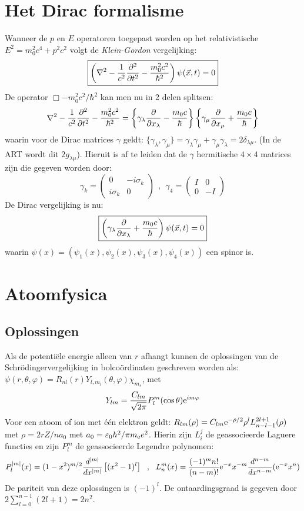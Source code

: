 \documentclass[twoside]{report}
\begin{document}
\section[~~Het Dirac formalisme]{Het Dirac formalisme}
Wanneer de $p$ en $E$ operatoren toegepast worden op het relativistische
$E^2=m_0^2c^4+p^2c^2$ volgt de {\it Klein-Gordon} vergelijking:
\[
\mbox{\fbox{$\displaystyle
\left(\nabla^2-\frac{1}{c^2}\frac{\partial^2 }{\partial t^2}-\frac{m_0^2c^2}{\hbar^2}\right)\psi(\vec{x},t)=0
$}}
\]
De operator $\Box-m_0^2c^2/\hbar^2$ kan men nu in 2 delen splitsen:
\[
\nabla^2-\frac{1}{c^2}\frac{\partial^2 }{\partial t^2}-\frac{m_0^2c^2}{\hbar^2}=
\left\{\gamma_\lambda\frac{\partial }{\partial x_\lambda}-\frac{m_0c}{\hbar}\right\}
\left\{\gamma_\mu\frac{\partial }{\partial x_\mu}+\frac{m_0c}{\hbar}\right\}
\]
waarin voor de Dirac matrices $\gamma$ geldt:
$\{\gamma_\lambda,\gamma_\mu\}=
\gamma_\lambda\gamma_\mu+\gamma_\mu\gamma_\lambda=2\delta_{\lambda\mu}$.
(In de ART wordt dit $2g_{\lambda\mu}$).
Hieruit is af te leiden dat de $\gamma$ hermitische $4\times4$ matrices zijn
die gegeven worden door:
\[
\gamma_k=\left(\begin{array}{cc}0&-i\sigma_k\\i\sigma_k&0\end{array}\right)~~,~~
\gamma_4=\left(\begin{array}{cc}I&0\\0&-I\end{array}\right)
\]
De Dirac vergelijking is nu:
\[
\mbox{\fbox{$\displaystyle
\left(\gamma_\lambda\frac{\partial }{\partial x_\lambda}+\frac{m_0c}{\hbar}\right)\psi(\vec{x},t)=0
$}}
\]
waarin $\psi(x)=(\psi_1(x),\psi_2(x),\psi_3(x),\psi_4(x))$ een spinor is.

\section[~~Atoomfysica]{Atoomfysica}
\subsection[~~Oplossingen]{Oplossingen}
Als de potenti\"ele energie alleen van $r$ afhangt kunnen de oplossingen van
de Schr\"odingervergelijking in bolco\"ordinaten geschreven worden als:
$\psi(r,\theta,\varphi)=R_{nl}(r)Y_{l,m_l}(\theta,\varphi)\chi_{m_s}$, met
\[
Y_{lm}=\frac{C_{lm}}{\sqrt{2\pi}}P_l^m(\cos\theta){\rm e}^{im\varphi}
\]
Voor een atoom of ion met \'e\'en elektron geldt:
$\displaystyle
R_{lm}(\rho)=C_{lm}{\rm e}^{-\rho/2}\rho^l L_{n-l-1}^{2l+1}(\rho)$
\npar
met $\rho=2rZ/na_0$ met $a_0=\varepsilon_0 h^2/\pi m_{\rm e} e^2$. Hierin zijn
$L_i^j$ de geassocieerde Laguere functies en zijn $P_l^m$ de geassocieerde
Legendre polynomen:
\[
P_l^{|m|}(x)=(1-x^2)^{m/2}\frac{d^{|m|}}{dx^{|m|}}\left[(x^2-1)^l\right]~~,~~
L_n^m(x)=\frac{(-1)^mn!}{(n-m)!}{\rm e}^{-x}x^{-m}\frac{d^{n-m}}{dx^{n-m}}({\rm e}^{-x}x^n)
\]
De pariteit van deze oplossingen is $(-1)^l$. De ontaardingsgraad is gegeven
door $2\sum\limits_{l=0}^{n-1}(2l+1)=2n^2$.
\end{document}
